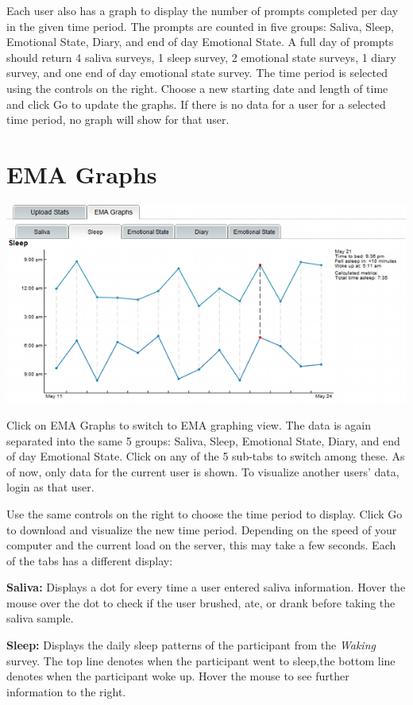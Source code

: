 \documentclass{article}
\begin{document}
Each user also has a graph to display the number of prompts completed per day in the given time period.
The prompts are counted in five groups: Saliva, Sleep, Emotional State, Diary, and end of day Emotional State.
A full day of prompts should return 4 saliva surveys, 1 sleep survey, 2 emotional state surveys, 1 diary survey, and 
one end of day emotional state survey.  The time period is selected using the controls on the right.  Choose a new starting date
and length of time and click Go to update the graphs.  If there is no data for a user for a selected time period, no graph will show for that user.

\section*{EMA Graphs}
\begin{center}
	\includegraphics[width=6in]{ema-shrunk}
\end{center}

Click on EMA Graphs to switch to EMA graphing view.  The data is again separated into the same 5 groups: Saliva,
Sleep, Emotional State, Diary, and end of day Emotional State.  Click on any of the 5 sub-tabs to switch among these.
As of now, only data for the current user is shown.  To visualize another users' data, login as that user.

Use the same controls on the right to choose the time period to display.  Click Go to download and visualize
the new time period.  Depending on the speed of your computer and the current load on the server, this may
take a few seconds.   Each of the tabs has a different display:

{\bf Saliva:} Displays a dot for every time a user entered saliva information.  Hover the mouse over the dot
	to check if the user brushed, ate, or drank before taking the saliva sample.

{\bf Sleep:} Displays the daily sleep patterns of the participant from the \emph{Waking} survey.  The top line denotes when the participant
	went to sleep,the bottom line denotes when the participant woke up.  Hover the mouse to see further information
	to the right.
\end{document}

